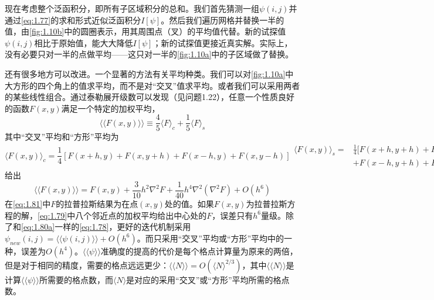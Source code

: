 \documentclass[12pt]{book}
\numberwithin{equation}{chapter}
\numberwithin{figure}{chapter}
\numberwithin{footnote}{page}
\begin{document}
现在考虑整个泛函积分，即所有子区域积分的总和。我们首先猜测一组$\psi(i,j)$并通过\autoref{eq:1.77}的求和形式近似泛函积分$I[\psi]$。然后我们遍历网格并替换一半的值，由\autoref{fig:1.10b}中的圆圈表示，用其周围点（叉）的平均值代替。新的试探值$\psi(i,j)$相比于原始值，能大大降低$I[\psi]$；新的试探值更接近真实解。实际上，没有必要只对一半的点做平均——这只对一半的\autoref{fig:1.10a}中的子区域做了替换。

还有很多地方可以改进。一个显著的方法有关平均种类。我们可以对\autoref{fig:1.10a}中大方形的四个角上的值求平均，而不是对“交叉”值求平均。或者我们可以采用两者的某些线性组合。通过泰勒展开级数可以发现（见问题1.22），任意一个性质良好的函数$F(x,y)$满足一个特定的加权平均，
\begin{equation}\label{eq:1.79}
    \langle\langle F(x,y)\rangle\rangle\equiv\frac{4}{5}\langle F \rangle_c+\frac{1}{5}\langle F \rangle_s
\end{equation}
其中“交叉”平均和“方形”平均为
\begin{subequations}\label{eq:1.80}
    \begin{equation}\label{eq:1.80a}
        \langle F(x,y)\rangle_c=\frac{1}{4}[F(x+h,y)+F(x,y+h)+F(x-h,y)+F(x,y-h)]
    \end{equation}
    \begin{equation}\label{eq:1.80b}
        \begin{aligned}
            \langle F(x,y)\rangle_s=&\frac{1}{4}[F(x+h,y+h)+F(x+h,y-h)\\
            &+F(x-h,y+h)+F(x-h,y-h)]
        \end{aligned}
    \end{equation}
\end{subequations}
给出
\begin{equation}\label{eq:1.81}
     \langle\langle F(x,y)\rangle\rangle=F(x,y)+\frac{3}{10}h^2\nabla^2F+\frac{1}{40}h^4\nabla^2(\nabla^2F)+O(h^6)
\end{equation}
在\autoref{eq:1.81}中$F$的拉普拉斯结果为在点$(x,y)$处的值。如果$F(x,y)$为拉普拉斯方程的解，\autoref{eq:1.79}中八个邻近点的加权平均给出中心处的$F$，误差只有$h^6$量级。除了和\autoref{eq:1.80a}一样的\autoref{eq:1.78}，更好的迭代机制采用$\psi_{new}(i,j)=\langle\langle \psi(i,j)\rangle\rangle+O(h^6)$。而只采用“交叉”平均或“方形”平均中的一种，误差为$O(h^4)$。$\langle\langle\psi\rangle\rangle$准确度的提高的代价是每个格点计算量为原来的两倍，但是对于相同的精度，需要的格点远远更少：$\langle\langle N\rangle\rangle=O(\langle N\rangle^{2/3})$，其中$\langle\langle N\rangle\rangle$是计算$\langle\langle\psi\rangle\rangle$所需要的格点数，而$\langle N\rangle$是对应的采用“交叉”或“方形”平均所需的格点数。
\end{document}
